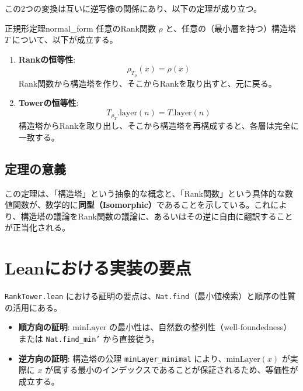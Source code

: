 \documentclass[report, paper=a4, fontsize=11pt, openany]{jlreq}
\newcommand{\layer}{\mathrm{layer}}
\newcommand{\minLayer}{\mathrm{minLayer}}
\newcommand{\rank}{\rho}
\begin{document}
この2つの変換は互いに逆写像の関係にあり、以下の定理が成り立つ。

\begin{theorem}{正規形定理}{normal_form}
任意のRank関数 $\rho$ と、任意の（最小層を持つ）構造塔 $T$ について、以下が成立する。

\begin{enumerate}
    \item \textbf{Rankの恒等性}:
    \[ \rank_{T_\rho}(x) = \rho(x) \]
    Rank関数から構造塔を作り、そこからRankを取り出すと、元に戻る。

    \item \textbf{Towerの恒等性}:
    \[ T_{\rank_T}.\layer(n) = T.\layer(n) \]
    構造塔からRankを取り出し、そこから構造塔を再構成すると、各層は完全に一致する。
\end{enumerate}
\end{theorem}

\section{定理の意義}
この定理は、「構造塔」という抽象的な概念と、「Rank関数」という具体的な数値関数が、数学的に\textbf{同型（Isomorphic）}であることを示している。これにより、構造塔の議論をRank関数の議論に、あるいはその逆に自由に翻訳することが正当化される。

\chapter{Leanにおける実装の要点}

\texttt{RankTower.lean} における証明の要点は、\texttt{Nat.find}（最小値検索）と順序の性質の活用にある。

\begin{itemize}
    \item \textbf{順方向の証明}: $\minLayer$ の最小性は、自然数の整列性（well-foundedness）または \texttt{Nat.find\_min'} から直接従う。
    \item \textbf{逆方向の証明}: 構造塔の公理 \texttt{minLayer\_minimal} により、$\minLayer(x)$ が実際に $x$ が属する最小のインデックスであることが保証されるため、等価性が成立する。
\end{itemize}
\end{document}
